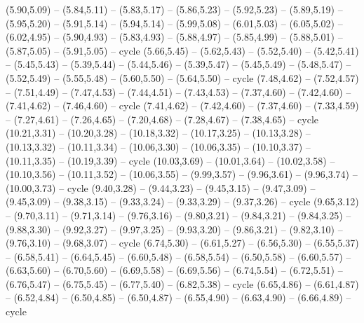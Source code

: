 \expandafter\def\csname geo:gebiet:GBR\endcsname{
  (5.90,5.09) -- (5.84,5.11) -- (5.83,5.17) -- (5.86,5.23) -- (5.92,5.23) -- (5.89,5.19) -- (5.95,5.20) -- (5.91,5.14) -- (5.94,5.14) -- (5.99,5.08) -- (6.01,5.03) -- (6.05,5.02) -- (6.02,4.95) -- (5.90,4.93) -- (5.83,4.93) -- (5.88,4.97) -- (5.85,4.99) -- (5.88,5.01) -- (5.87,5.05) -- (5.91,5.05) -- cycle}
\expandafter\def\csname geo:gebiet:ISL\endcsname{
  (5.66,5.45) -- (5.62,5.43) -- (5.52,5.40) -- (5.42,5.41) -- (5.45,5.43) -- (5.39,5.44) -- (5.44,5.46) -- (5.39,5.47) -- (5.45,5.49) -- (5.48,5.47) -- (5.52,5.49) -- (5.55,5.48) -- (5.60,5.50) -- (5.64,5.50) -- cycle}
\expandafter\def\csname geo:gebiet:AZE\endcsname{
  (7.48,4.62) -- (7.52,4.57) -- (7.51,4.49) -- (7.47,4.53) -- (7.44,4.51) -- (7.43,4.53) -- (7.37,4.60) -- (7.42,4.60) -- (7.41,4.62) -- (7.46,4.60) -- cycle}
\expandafter\def\csname geo:gebiet:GEO\endcsname{
  (7.41,4.62) -- (7.42,4.60) -- (7.37,4.60) -- (7.33,4.59) -- (7.27,4.61) -- (7.26,4.65) -- (7.20,4.68) -- (7.28,4.67) -- (7.38,4.65) -- cycle}
\expandafter\def\csname geo:gebiet:PHL\endcsname{
  (10.21,3.31) -- (10.20,3.28) -- (10.18,3.32) -- (10.17,3.25) -- (10.13,3.28) -- (10.13,3.32) -- (10.11,3.34) -- (10.06,3.30) -- (10.06,3.35) -- (10.10,3.37) -- (10.11,3.35) -- (10.19,3.39) -- cycle
  (10.03,3.69) -- (10.01,3.64) -- (10.02,3.58) -- (10.10,3.56) -- (10.11,3.52) -- (10.06,3.55) -- (9.99,3.57) -- (9.96,3.61) -- (9.96,3.74) -- (10.00,3.73) -- cycle}
\expandafter\def\csname geo:gebiet:MYS\endcsname{
  (9.40,3.28) -- (9.44,3.23) -- (9.45,3.15) -- (9.47,3.09) -- (9.45,3.09) -- (9.38,3.15) -- (9.33,3.24) -- (9.33,3.29) -- (9.37,3.26) -- cycle
  (9.65,3.12) -- (9.70,3.11) -- (9.71,3.14) -- (9.76,3.16) -- (9.80,3.21) -- (9.84,3.21) -- (9.84,3.25) -- (9.88,3.30) -- (9.92,3.27) -- (9.97,3.25) -- (9.93,3.20) -- (9.86,3.21) -- (9.82,3.10) -- (9.76,3.10) -- (9.68,3.07) -- cycle}
\expandafter\def\csname geo:gebiet:BRN\endcsname{
  }
\expandafter\def\csname geo:gebiet:SVN\endcsname{
  }
\expandafter\def\csname geo:gebiet:FIN\endcsname{
  (6.74,5.30) -- (6.61,5.27) -- (6.56,5.30) -- (6.55,5.37) -- (6.58,5.41) -- (6.64,5.45) -- (6.60,5.48) -- (6.58,5.54) -- (6.50,5.58) -- (6.60,5.57) -- (6.63,5.60) -- (6.70,5.60) -- (6.69,5.58) -- (6.69,5.56) -- (6.74,5.54) -- (6.72,5.51) -- (6.76,5.47) -- (6.75,5.45) -- (6.77,5.40) -- (6.82,5.38) -- cycle}
\expandafter\def\csname geo:gebiet:SVK\endcsname{
  (6.65,4.86) -- (6.61,4.87) -- (6.52,4.84) -- (6.50,4.85) -- (6.50,4.87) -- (6.55,4.90) -- (6.63,4.90) -- (6.66,4.89) -- cycle}

